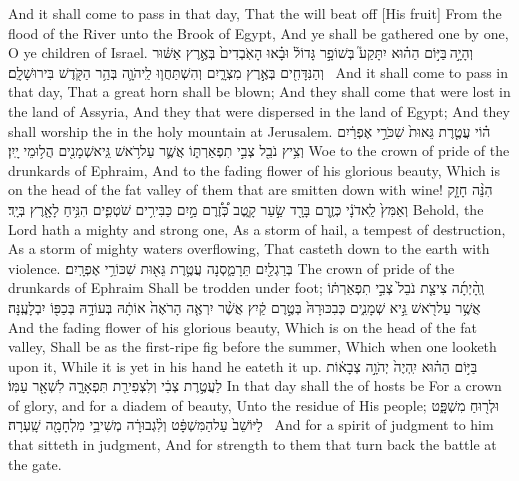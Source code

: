 {And it shall come to pass in that day, That the \lord\space will beat off [His fruit] From the flood of the River unto the Brook of Egypt, And ye shall be gathered one by one, O ye children of Israel.}
{וְהָיָ֣ה \legarmeh  בַּיּ֣וֹם הַה֗וּא יִתָּקַע֮ בְּשׁוֹפָ֣ר גָּדוֹל֒ וּבָ֗אוּ הָאֹֽבְדִים֙ בְּאֶ֣רֶץ אַשּׁ֔וּר וְהַנִּדָּחִ֖ים בְּאֶ֣רֶץ מִצְרָ֑יִם וְהִשְׁתַּחֲו֧וּ לַֽיהֹוָ֛ה בְּהַ֥ר הַקֹּ֖דֶשׁ בִּירוּשָׁלָֽ͏ִם׃ \petucha }
{And it shall come to pass in that day, That a great horn shall be blown; And they shall come that were lost in the land of Assyria, And they that were dispersed in the land of Egypt; And they shall worship the \lord\space in the holy mountain at Jerusalem.}
\newperek
{}
{ה֗וֹי עֲטֶ֤רֶת גֵּאוּת֙ שִׁכֹּרֵ֣י אֶפְרַ֔יִם וְצִ֥יץ נֹבֵ֖ל צְבִ֣י תִפְאַרְתּ֑וֹ אֲשֶׁ֛ר עַל\maqqaf רֹ֥אשׁ גֵּֽיא\maqqaf שְׁמָנִ֖ים הֲל֥וּמֵי יָֽיִן׃}
{Woe to the crown of pride of the drunkards of Ephraim, And to the fading flower of his glorious beauty, Which is on the head of the fat valley of them that are smitten down with wine!}
{הִנֵּ֨ה חָזָ֤ק וְאַמִּץ֙ לַֽאדֹנָ֔י כְּזֶ֥רֶם בָּרָ֖ד שַׂ֣עַר קָ֑טֶב כְּ֠זֶ֠רֶם מַ֣יִם כַּבִּירִ֥ים שֹׁטְפִ֛ים הִנִּ֥יחַ לָאָ֖רֶץ בְּיָֽד׃}
{Behold, the Lord hath a mighty and strong one, As a storm of hail, a tempest of destruction, As a storm of mighty waters overflowing, That casteth down to the earth with violence.}
{בְּרַגְלַ֖יִם תֵּרָמַ֑סְנָה עֲטֶ֥רֶת גֵּא֖וּת שִׁכּוֹרֵ֥י אֶפְרָֽיִם׃}
{The crown of pride of the drunkards of Ephraim Shall be trodden under foot;}
{וְֽהָ֨יְתָ֜ה צִיצַ֤ת נֹבֵל֙ צְבִ֣י תִפְאַרְתּ֔וֹ אֲשֶׁ֥ר עַל\maqqaf רֹ֖אשׁ גֵּ֣יא שְׁמָנִ֑ים כְּבִכּוּרָהּ֙ בְּטֶ֣רֶם קַ֔יִץ אֲשֶׁ֨ר יִרְאֶ֤ה הָרֹאֶה֙ אוֹתָ֔הּ בְּעוֹדָ֥הּ בְּכַפּ֖וֹ יִבְלָעֶֽנָּה׃ \setuma }
{And the fading flower of his glorious beauty, Which is on the head of the fat valley, Shall be as the first-ripe fig before the summer, Which when one looketh upon it, While it is yet in his hand he eateth it up.}
{בַּיּ֣וֹם הַה֗וּא יִֽהְיֶה֙ יְהֹוָ֣ה צְבָא֔וֹת לַעֲטֶ֣רֶת צְבִ֔י וְלִצְפִירַ֖ת תִּפְאָרָ֑ה לִשְׁאָ֖ר עַמּֽוֹ׃}
{In that day shall the \lord\space of hosts be For a crown of glory, and for a diadem of beauty, Unto the residue of His people;}
{וּלְר֖וּחַ מִשְׁפָּ֑ט לַיּוֹשֵׁב֙ עַל\maqqaf הַמִּשְׁפָּ֔ט וְלִ֨גְבוּרָ֔ה מְשִׁיבֵ֥י מִלְחָמָ֖ה שָֽׁעְרָה׃ \setuma }
{And for a spirit of judgment to him that sitteth in judgment, And for strength to them that turn back the battle at the gate.}
